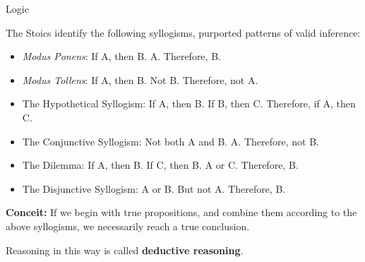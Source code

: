 \documentclass[8pt]{beamer}\usepackage[]{graphicx}\usepackage[]{color}
\begin{document}
\begin{frame}{Logic}

%
The Stoics identify the following syllogisms, purported patterns of
valid inference:
%
\begin{itemize}
%
\item \emph{Modus Ponens}: If A, then B.  A.  Therefore, B.
\item \emph{Modus Tollens}: If A, then B.  Not B.  Therefore, not A.
\item The Hypothetical Syllogism: If A, then B.  If B, then C.  Therefore, if A, then C.
\item The Conjunctive Syllogism: Not both A and B.  A.  Therefore, not B.
\item The Dilemma: If A, then B.  If C, then B.  A or C.  Therefore, B.
\item The Disjunctive Syllogism: A or B.  But not A.  Therefore, B.
%
\end{itemize}
%
\pause

\textbf{Conceit:} If we begin with true propositions, and combine them according
to the above syllogisms, we necessarily reach a true conclusion.

Reasoning in this way is called \textbf{deductive reasoning}.


%
%
\end{frame}


\end{document}
